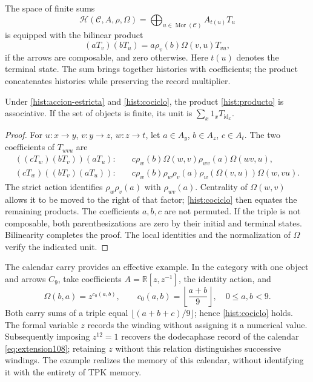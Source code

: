 The space of finite sums
\[
 \mathcal H(\mathcal C,A,\rho,\Omega)
   =\bigoplus_{u\in\operatorname{Mor}(\mathcal C)} A_{t(u)}T_u
\]
is equipped with the bilinear product
\begin{equation}
 (aT_v)(bT_u)=a\rho_v(b)\Omega(v,u)T_{vu},
 \label{hist:producto}
\end{equation}
if the arrows are composable, and zero otherwise. Here \(t(u)\)
denotes the terminal state. The sum brings together histories with coefficients; the
product concatenates histories while preserving the record multiplier.

\begin{proposition}
Under \eqref{hist:accion-estricta} and \eqref{hist:cociclo}, the product
\eqref{hist:producto} is associative. If the set of objects is finite,
its unit is \(\sum_x1_xT_{\operatorname{id}_x}\).
\end{proposition}
\begin{proof}
For \(u:x\to y\), \(v:y\to z\), \(w:z\to t\), let
\(a\in A_y\), \(b\in A_z\), \(c\in A_t\). The two coefficients
of \(T_{wvu}\) are
\begin{align*}
 ((cT_w)(bT_v))(aT_u):\quad&
 c\rho_w(b)\Omega(w,v)\rho_{wv}(a)\Omega(wv,u),\\
 (cT_w)((bT_v)(aT_u)):\quad&
 c\rho_w(b)\rho_w\rho_v(a)\rho_w(\Omega(v,u))\Omega(w,vu).
\end{align*}
The strict action identifies \(\rho_w\rho_v(a)\) with \(\rho_{wv}(a)\).
Centrality of \(\Omega(w,v)\) allows it to be moved to the right of
that factor; \eqref{hist:cociclo} then equates the remaining products.
The coefficients \(a,b,c\) are not permuted. If the triple is not composable,
both parenthesizations are zero by their initial and terminal states.
Bilinearity completes the proof. The local identities and the
normalization of \(\Omega\) verify the indicated unit.
\end{proof}

The calendar carry provides an effective example. In the category
with one object and arrows \(C_9\), take coefficients
\(A=\mathbb R[z,z^{-1}]\), the identity action, and
\[
 \Omega(b,a)=z^{c_0(a,b)},\qquad
 c_0(a,b)=\left\lfloor\frac{a+b}{9}\right\rfloor,
 \quad 0\leq a,b<9.
\]
Both carry sums of a triple equal
\(\lfloor(a+b+c)/9\rfloor\); hence
\eqref{hist:cociclo} holds. The formal variable \(z\) records the winding without
assigning it a numerical value. Subsequently imposing \(z^{12}=1\) recovers the
dodecaphase record of the calendar \eqref{eq:extension108}; retaining
\(z\) without this relation distinguishes successive windings. The example realizes
the memory of this calendar, without identifying it with the entirety of
TPK memory.

